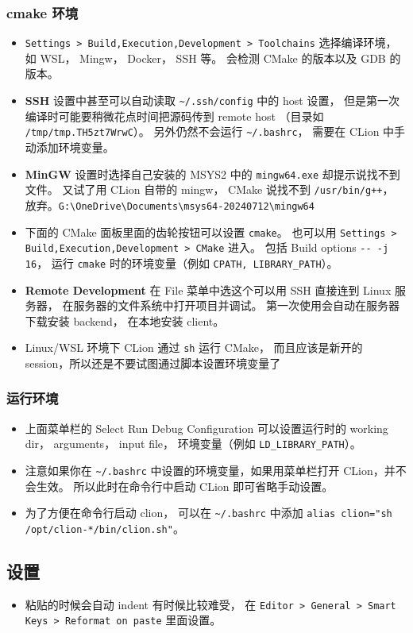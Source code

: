 \subsubsection{cmake 环境}
\begin{itemize}
\item \verb`Settings > Build,Execution,Development > Toolchains` 选择编译环境， 如 WSL， Mingw， Docker， SSH 等。 会检测 CMake 的版本以及 GDB 的版本。
\item \textbf{SSH} 设置中甚至可以自动读取 \verb`~/.ssh/config` 中的 host 设置， 但是第一次编译时可能要稍微花点时间把源码传到 remote host （目录如 \verb`/tmp/tmp.TH5zt7WrwC`）。 另外仍然不会运行 \verb`~/.bashrc`， 需要在 CLion 中手动添加环境变量。
\item \textbf{MinGW} 设置时选择自己安装的 MSYS2 中的 \verb`mingw64.exe` 却提示说找不到文件。 又试了用 CLion 自带的 mingw， CMake 说找不到 \verb`/usr/bin/g++`， 放弃。\verb`G:\OneDrive\Documents\msys64-20240712\mingw64`
\item 下面的 CMake 面板里面的齿轮按钮可以设置 \verb`cmake`。 也可以用 \verb`Settings > Build,Execution,Development > CMake` 进入。 包括 Build options \verb`-- -j 16`， 运行 \verb`cmake` 时的环境变量（例如 \verb`CPATH, LIBRARY_PATH`）。
\item \textbf{Remote Development} 在 File 菜单中选这个可以用 SSH 直接连到 Linux 服务器， 在服务器的文件系统中打开项目并调试。 第一次使用会自动在服务器下载安装 backend， 在本地安装 client。
\item Linux/WSL 环境下 CLion 通过 \verb`sh` 运行 CMake， 而且应该是新开的 session，所以还是不要试图通过脚本设置环境变量了
\end{itemize}

\subsubsection{运行环境}
\begin{itemize}
\item 上面菜单栏的 Select Run Debug Configuration 可以设置运行时的 working dir， arguments， input file， 环境变量（例如 \verb`LD_LIBRARY_PATH`）。
\item 注意如果你在 \verb`~/.bashrc` 中设置的环境变量，如果用菜单栏打开 CLion，并不会生效。 所以此时在命令行中启动 CLion 即可省略手动设置。
\item 为了方便在命令行启动 clion， 可以在 \verb`~/.bashrc` 中添加 \verb`alias clion="sh /opt/clion-*/bin/clion.sh"`。
\end{itemize}

\subsection{设置}
\begin{itemize}
\item 粘贴的时候会自动 indent 有时候比较难受， 在 \verb`Editor > General > Smart Keys > Reformat on paste` 里面设置。
\end{itemize}
